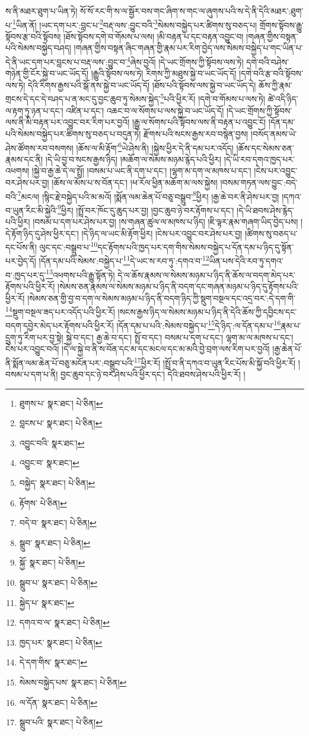 ས་ནི་མཐར་ཐུག་པ་ཡིན་ཏེ། སོ་སོ་རང་གི་ས་ལ་སྦྱོར་བས་གང་ཞིག་ས་གང་ལ་ཞུགས་པའི་ས་དེ་ནི་དེའི་མཐར་:ཐུག་པ་\footnote{ཐུགས་པ་  སྣར་ཐང་།  པེ་ཅིན། }ཡིན་ནོ། །ཡང་དག་པར་:བླང་པ་\footnote{བླངས་པ་  སྣར་ཐང་།  པེ་ཅིན། }བརྡ་ལས་:བྱུང་བའི་\footnote{འབྱུང་བའི་  སྣར་ཐང་། }སེམས་བསྐྱེད་པར་ཚིགས་སུ་བཅད་པ། གྲོགས་སྟོབས་རྒྱུ་སྟོབས་རྩ་བའི་སྟོབས། །ཐོས་སྟོབས་དགེ་བ་གོམས་པ་ལས། །མི་བརྟན་པ་དང་བརྟན་འབྱུང་བ། །གཞན་གྱིས་བསྟན་པའི་སེམས་བསྐྱེད་བཤད། །གཞན་གྱིས་བསྟན་ཞིང་གཞན་གྱི་རྣམ་པར་རིག་བྱེད་ལས་སེམས་བསྐྱེད་པ་གང་ཡིན་པ་དེ་ནི་ཡང་དག་པར་བླངས་པ་བརྡ་ལས་:བྱུང་བ་\footnote{འབྱུང་བ་  སྣར་ཐང་། }ཞེས་བྱའོ། །དེ་ཡང་གྲོགས་ཀྱི་སྟོབས་ལས་ཏེ། དགེ་བའི་བཤེས་གཉེན་གྱི་ངོར་སྐྱེ་བ་ཡང་ཡོད་དོ། །རྒྱུའི་སྟོབས་ལས་ཏེ། རིགས་ཀྱི་མཐུས་སྐྱེ་བ་ཡང་ཡོད་དོ། །དགེ་བའི་རྩ་བའི་སྟོབས་ལས་ཏེ། དེའི་རིགས་རྒྱས་པའི་སྒོ་ནས་སྐྱེ་བ་ཡང་ཡོད་དོ། །ཐོས་པའི་སྟོབས་ལས་སྐྱེ་བ་ཡང་ཡོད་དེ། ཆོས་ཀྱི་རྣམ་གྲངས་དེ་དང་དེ་བཤད་པ་ན་མང་དུ་བྱང་ཆུབ་ཏུ་སེམས་སྐྱེད་\footnote{བསྐྱེད་  སྣར་ཐང་།  པེ་ཅིན། }པའི་ཕྱིར་རོ། །དགེ་བ་གོམས་པ་ལས་ཏེ། ཚེ་འདི་ཉིད་ལ་རྟག་ཏུ་ཉན་པ་དང་། འཛིན་པ་དང་། འཆང་བ་ལ་སོགས་པ་ལས་སྐྱེ་བ་ཡང་ཡོད་དོ། །དེ་ཡང་གྲོགས་ཀྱི་སྟོབས་ལས་ནི་མི་བརྟན་པར་འབྱུང་བར་རིག་པར་བྱའོ། །རྒྱུ་ལ་སོགས་པའི་སྟོབས་ལས་ནི་བརྟན་པ་འབྱུང་ངོ། །དོན་དམ་པའི་སེམས་བསྐྱེད་པར་ཚིགས་སུ་བཅད་པ་བདུན་ཏེ། རྫོགས་པའི་སངས་རྒྱས་རབ་བསྙེན་བྱས། །བསོད་ནམས་ཡེ་ཤེས་ཚོགས་རབ་བསགས། །ཆོས་ལ་མི་རྟོག་\footnote{རྟོགས་  པེ་ཅིན། }ཡེ་ཤེས་ནི། །སྐྱེས་ཕྱིར་དེ་ནི་དམ་པར་འདོད། །ཆོས་དང་སེམས་ཅན་རྣམས་དང་ནི། །དེ་ཡི་བྱ་བ་སངས་རྒྱས་ཉིད། །མཆོག་ལ་སེམས་མཉམ་རྙེད་པའི་ཕྱིར། །དེ་ཡི་རབ་དགའ་ཁྱད་པར་འཕགས། །སྐྱེ་བ་རྒྱ་ཆེ་དེ་ལ་སྤྲོ། །བསམ་པ་ཡང་ནི་དག་པ་དང་། །ལྷག་མ་དག་ལ་མཁས་པ་དང་། །ངེས་པར་འབྱུང་བར་ཤེས་པར་བྱ། །ཆོས་ལ་མོས་པ་ས་བོན་དང་། །ཕ་རོལ་ཕྱིན་མཆོག་མ་ལས་སྐྱེས། །བསམ་གཏན་ལས་བྱུང་:བདེ་བའི་\footnote{བདེ་བ་  སྣར་ཐང་།  པེ་ཅིན། }མངལ། །སྙིང་རྗེ་བསྐྱེད་པའི་མ་མའོ། །སྨོན་ལམ་ཆེན་པོ་བཅུ་བསྒྲུབ་\footnote{སྒྲུབ་  སྣར་ཐང་།  པེ་ཅིན། }ཕྱིར། །རྒྱ་ཆེ་བར་ནི་ཤེས་པར་བྱ། །དཀའ་བ་ཡུན་རིང་མི་སྐྱེའི་\footnote{སྐྱོ་  སྣར་ཐང་།  པེ་ཅིན། }ཕྱིར། །སྤྲོ་བར་ཁོང་དུ་ཆུད་པར་བྱ། །བྱང་ཆུབ་ཉེ་བར་རྟོགས་པ་དང་། །དེ་ཡི་ཐབས་ཤེས་རྙེད་པའི་ཕྱིར། །བསམ་པ་དག་པར་ཤེས་པར་བྱ། །ས་གཞན་ཚུལ་ལ་མཁས་པ་ཉིད། །ཇི་ལྟར་རྣམ་གཞག་ཡིད་བྱེད་པས། །དེ་རྟོག་ཉིད་དུ་ཤེས་ཕྱིར་དང་། །དེ་ཉིད་ལ་ཡང་མི་རྟོག་ཕྱིར། །ངེས་པར་འབྱུང་བར་ཤེས་པར་བྱ། །ཚིགས་སུ་བཅད་པ་དང་པོས་ནི། ལུང་དང་:བསྒྲུབ་པ་\footnote{སྒྲུབ་པ་  སྣར་ཐང་།  པེ་ཅིན། }དང་རྟོགས་པའི་ཁྱད་པར་དག་གིས་སེམས་བསྐྱེད་པ་དོན་དམ་པ་ཉིད་དུ་སྟོན་པར་བྱེད་དོ། །དོན་དམ་པའི་སེམས་:བསྐྱེད་པ་\footnote{སྐྱེད་པ་  སྣར་ཐང་། }དེ་ཡང་ས་རབ་ཏུ་:དགའ་བ་\footnote{དགའ་བ་ལ་  སྣར་ཐང་།  པེ་ཅིན། }ཡིན་པས་དེའི་རབ་ཏུ་དགའ་བ་:ཁྱད་པར་དུ་\footnote{ཁྱད་པར་  སྣར་ཐང་།  པེ་ཅིན། }འཕགས་པའི་རྒྱུ་སྟོན་ཏེ། དེ་ལ་ཆོས་རྣམས་ལ་སེམས་མཉམ་པ་ཉིད་ནི་ཆོས་ལ་བདག་མེད་པར་རྟོགས་པའི་ཕྱིར་རོ། །སེམས་ཅན་རྣམས་ལ་སེམས་མཉམ་པ་ཉིད་ནི་བདག་དང་གཞན་མཉམ་པ་ཉིད་དུ་རྟོགས་པའི་ཕྱིར་རོ། །སེམས་ཅན་གྱི་བྱ་བ་དག་ལ་སེམས་མཉམ་པ་ཉིད་ནི་བདག་ཉིད་ཀྱི་སྡུག་བསྔལ་དང་འདྲ་བར་:དེ་དག་གི་\footnote{དེ་དག་གིས་  སྣར་ཐང་། }སྡུག་བསྔལ་ཟད་པར་འདོད་པའི་ཕྱིར་རོ། །སངས་རྒྱས་ཉིད་ལ་སེམས་མཉམ་པ་ཉིད་ནི་དེའི་ཆོས་ཀྱི་དབྱིངས་དང་བདག་དབྱེར་མེད་པར་རྟོགས་པའི་ཕྱིར་རོ། །དོན་དམ་པ་པའི་:སེམས་བསྐྱེད་པ་\footnote{སེམས་བསྐྱེད་པས་  སྣར་ཐང་།  པེ་ཅིན། }དེ་ཉིད་:ལ་དོན་དམ་པ་\footnote{ལ་དོན་  སྣར་ཐང་།  པེ་ཅིན། }རྣམ་པ་དྲུག་ཏུ་རིག་པར་བྱ་སྟེ། སྐྱེ་བ་དང་། རྒྱ་ཆེ་བ་དང་། སྤྲོ་བ་དང་། བསམ་པ་དག་པ་དང་། ལྷག་མ་ལ་མཁས་པ་དང་། ངེས་པར་འབྱུང་བའོ། །དེ་ལ་སྐྱེ་བ་ནི་ས་བོན་དང་མ་དང་མངལ་དང་མ་མའི་བྱེ་བྲག་ལས་རིག་པར་བྱའོ། །རྒྱ་ཆེན་པོ་ནི་སྨོན་ལམ་ཆེན་པོ་བཅུ་མངོན་པར་:བསྒྲུབ་པའི་\footnote{སྒྲུབ་པའི་  སྣར་ཐང་།  པེ་ཅིན། }ཕྱིར་རོ། །སྤྲོ་བ་ནི་དཀའ་བ་ཡུན་རིང་པོས་མི་སྐྱོ་བའི་ཕྱིར་རོ། །བསམ་པ་དག་པ་ནི། བྱང་ཆུབ་དང་ཉེ་བར་ཤེས་པའི་ཕྱིར་དང་། དེའི་ཐབས་ཤེས་པའི་ཕྱིར་རོ། །
